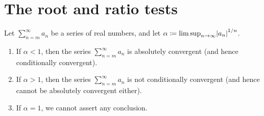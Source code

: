 \section{The root and ratio tests}\label{sec 7.5}

\begin{theorem}\label{7.5.1}
Let \(\sum_{n = m}^\infty a_n\) be a series of real numbers, and let \(\alpha \coloneqq \lim\sup_{n \to \infty} \abs*{a_n}^{1 / n}\).
\begin{enumerate}
    \item If \(\alpha < 1\), then the series \(\sum_{n = m}^\infty a_n\) is absolutely convergent
    (and hence conditionally convergent).
    \item If \(\alpha > 1\), then the series \(\sum_{n = m}^\infty a_n\) is not conditionally convergent
    (and hence cannot be absolutely convergent either).
    \item If \(\alpha = 1\), we cannot assert any conclusion.
\end{enumerate}
\end{theorem}

